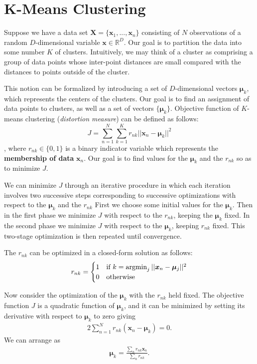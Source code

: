 

\section{K-Means Clustering}
Suppose we have a data set $\mathbf{X} = \{\mathbf{x}_1,...,\mathbf{x}_n\}$ consisting of $N$ observations of a random $D$-dimensional variable $\mathbf{x}\in \mathbb{R}^{D}$. Our goal is to partition the data into some number $K$ of clusters.  Intuitively, we may think of a cluster as comprising a group of data points whose inter-point distances are small compared with the distances to points outside of the cluster.

This notion can be formalized by introducing a set of $D$-dimensional vectors $\boldsymbol{\mu}_k$, which represents the centers of the clusters. Our goal is to find an assignment of data points to clusters, as well as a set of vectors $\{\boldsymbol{\mu}_k\}$. Objective function of $K$-means clustering (\textit{distortion measure}) can be defined as follows:
$$J =  \sum_{n=1}^{N}\sum_{k=1}^{K}r_{nk}||\boldsymbol{x}_n-\boldsymbol{\mu}_k||^2$$
, where $r_{nk}\in\{0,1\}$ is a binary indicator variable which represents the \textbf{membership of data} $\mathbf{x}_n$. Our goal is to find values for the $\boldsymbol{\mu}_k$ and the $r_{nk}$ so as to minimize $J$. 

We can minimize $J$ through an iterative procedure in which each iteration involves two successive steps corresponding to successive optimizations with respect to the $\boldsymbol{\mu}_k$ and the $r_{nk}$ First we choose some initial values for the $\boldsymbol{\mu}_k$. Then in the first phase we minimize $J$ with respect to the $r_{nk}$, keeping the $\boldsymbol{\mu}_k$ fixed. In the second phase we minimize $J$ with respect to the $\boldsymbol{\mu}_k$, keeping $r_{nk}$ fixed. This two-stage optimization is then repeated until convergence.

The $r_{nk}$ can be optimized in a closed-form solution as follows:
$$r_{nk}=\begin{cases}
1 & \textrm{if } k=\operatorname*{\operatorname{argmin}}_{j} ||\boldsymbol{x}_n-\boldsymbol{\mu}_j||^2\\
0 & \textrm{otherwise}
\end{cases}$$

Now consider the optimization of the $\boldsymbol{\mu}_k$ with the $r_{nk}$ held fixed. The objective function $J$ is a quadratic function of $\boldsymbol{\mu}_k$, and it can be minimized by setting its derivative with respect to $\boldsymbol{\mu}_k$ to zero giving
\begin{align*}
2\sum_{n=1}^{N}r_{nk}(\boldsymbol{x}_n-\boldsymbol{\mu}_k) = 0.
\end{align*}
We can arrange as
\begin{align*}
\boldsymbol{\mu}_k = \frac{\sum_n r_{nk}\boldsymbol{x}_n}{\sum_n r_{nk}}.
\end{align*}

